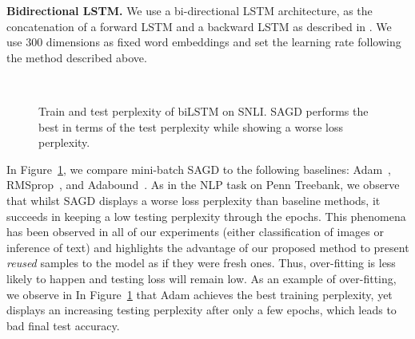 \documentclass[11pt]{article}
\begin{document}
\textbf{Bidirectional LSTM.}
We use a bi-directional LSTM architecture, as the concatenation of a forward LSTM and a backward LSTM as described in \citep{conneau2017supervised}.
We use $300$ dimensions as fixed word embeddings and set the learning rate following the method described above.
 \begin{figure}\vspace{-0.2in}
 \begin{center}
 \mbox{
 }
 \end{center}
 \vspace{-0.1in}
  \caption[]{Train and test perplexity of biLSTM on SNLI. 
 \textsc{SAGD} performs the best in terms of the test perplexity while showing a worse loss perplexity.
 } 
 \label{fig:snli}%
 \end{figure}
In Figure~\ref{fig:snli}, we compare mini-batch SAGD to the following baselines: Adam~\citep{kiba15},  RMSprop~\citep{tige12}, and Adabound~\citep{luxi2019}. 
As in the NLP task on Penn Treebank, we observe that whilst SAGD displays a worse loss perplexity than baseline methods, it succeeds in keeping a low testing perplexity through the epochs.
This phenomena has been observed in all of our experiments (either classification of images or inference of text) and highlights the advantage of our proposed method to present \emph{reused} samples to the model as if they were fresh ones. 
Thus, over-fitting is less likely to happen and testing loss will remain low.
As an example of over-fitting, we observe in In Figure~\ref{fig:snli} that Adam achieves the best training perplexity, yet displays an increasing testing perplexity after only a few epochs, which leads to bad final test accuracy.
\end{document}
